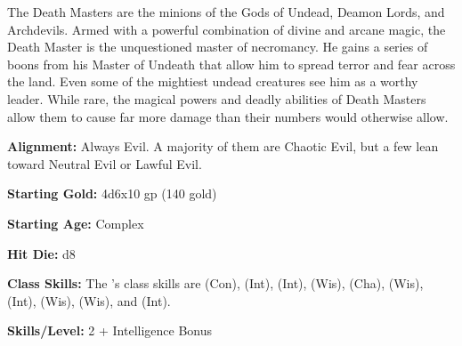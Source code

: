 
The Death Masters are the minions of the Gods of Undead, Deamon Lords, and Archdevils. Armed with a powerful combination of divine and arcane magic, the Death Master is the unquestioned master of necromancy. He gains a series of boons from his Master of Undeath that allow him to spread terror and fear across the land. Even some of the mightiest undead creatures see him as a worthy leader. While rare, the magical powers and deadly abilities of Death Masters allow them to cause far more damage than their numbers would otherwise allow.

\textbf{Alignment:} Always Evil. A majority of them are Chaotic Evil, but a few lean toward Neutral Evil or Lawful Evil.

\textbf{Starting Gold:} 4d6x10 gp (140 gold)

\textbf{Starting Age:} Complex

\textbf{Hit Die:} d8

\textbf{Class Skills:} The \currentclassname{}'s class skills are  (Con),  (Int),  (Int),  (Wis),  (Cha),  (Wis),  (Int),  (Wis),  (Wis), and  (Int).

\textbf{Skills/Level:} 2 + Intelligence Bonus

\poorbab{}
\poorfor{}
\poorref{}
\goodwil{}

\begin{fullcastingclasstable}
\end{fullcastingclasstable}

